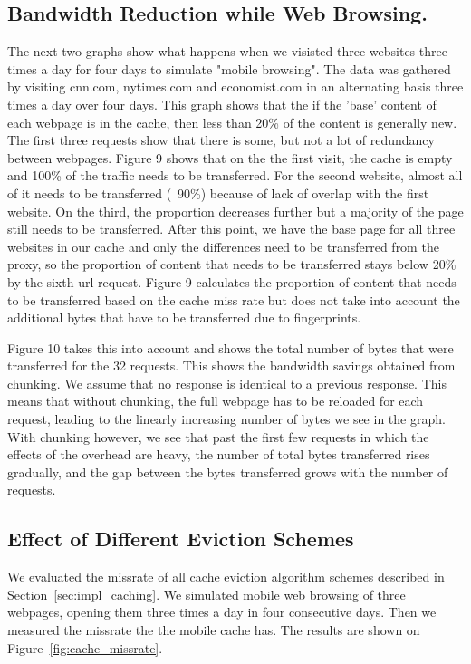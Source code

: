 \subsection{Bandwidth Reduction while Web Browsing.}
The next two graphs show what happens when we visisted three websites three times a day for four days to simulate "mobile browsing". 
The data was gathered by visiting cnn.com, nytimes.com and economist.com in an alternating basis three times a day over four days. This graph shows that the if the 'base' content of each webpage is in the cache, then less than 20\% of the content is generally new. The first three requests show that there is some, but not a lot of redundancy between webpages.
Figure 9 shows that on the the first visit, the cache is empty and 100\% of the traffic needs to be transferred. 
For the second website, almost all of it needs to be transferred (~90\%) because of lack of overlap with the first website. 
On the third, the proportion decreases further but a majority of the page still needs to be transferred. 
After this point, we have the base page for all three websites in our cache and only the differences need to be transferred from the proxy, so the proportion of content that needs to be transferred stays below 20\% by the sixth url request. 
Figure 9 calculates the proportion of content that needs to be transferred based on the cache miss rate but does not take into account the additional bytes that have to be transferred due to fingerprints.

Figure 10 takes this into account and shows the total number of bytes that were transferred for the 32 requests. This shows the bandwidth savings obtained from chunking.
We assume that no response is identical to a previous response. 
This means that without chunking, the full webpage has to be reloaded for each request, leading to the linearly increasing number of bytes we see in the graph. 
With chunking however, we see that past the first few requests in which the effects of the overhead are heavy, the number of total bytes transferred rises gradually, and the gap between the bytes transferred grows with the number of requests.

\subsection{Effect of Different Eviction Schemes}
We evaluated the missrate of  all cache eviction algorithm schemes described in Section~\ref{sec:impl_caching}. We
simulated mobile web browsing of three webpages, opening them three times a day in four consecutive days. Then we
measured the missrate the the mobile cache has. The results are shown on Figure~\ref{fig:cache_missrate}.

